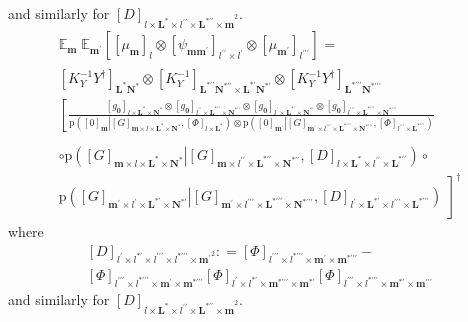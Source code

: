 \documentclass[preprint,12pt]{elsarticle}
\newcommand*{\M}[1]{\ensuremath{#1}\xspace}
\newcommand*{\x}{\times}
\newcommand*{\mi}[1]{\mathbf{#1}}
\newcommand*{\te}[2][]{\left\lbrack{#2}\right\rbrack_{#1}}
\newcommand*{\prob}[3]{\M{\mathrm{p}\!\left(\left.{#1}\right\vert{#2,#3}\right)}}
\newcommand*{\deq}{\M{\mathrel{\mathop:}=}}
\newcommand*{\evt}[3][]{\mathbb{E}_{#3}^{#1}\!#2}
\begin{document}
        and similarly for $\te[l\x\mi{L^{*}}\x l^{\prime\prime}\x\mi{L^{*\prime\prime}\x m}^{2}]{D}$.
        \begin{multline*}
            \evt{\;\evt{\te[]{\te[l]{\mu_{\mi{m}}} \otimes \te[l^{\prime\prime}\x l^{\prime}]{\psi_{\mi{mm^{\prime}}}} \otimes \te[l^{\prime\prime\prime}]{\mu_{\mi{m^{\prime}}}}}}{\mi{m^{\prime}}}}{\mi{m}} = \\
            \te[\mi{L^{*}N^{*}}]{K_{Y}^{-1} Y^{\dagger}} \otimes
            \te[\mi{L^{*\prime\prime}N^{*\prime\prime}}\x\mi{L^{*\prime}N^{*\prime}}]{K_{Y}^{-1}} \otimes
            \te[\mi{L^{*\prime\prime\prime}N^{*\prime\prime\prime}}]{K_{Y}^{-1} Y^{\dagger}} \\
            \left\lbrack\frac{
            \te[l\x\mi{L^{*}}\x\mi{N^{*}}]{g_{\mi{0}}} \otimes
            \te[l^{\prime\prime}\x\mi{L^{*\prime\prime}}\x\mi{N^{*\prime\prime}}]{g_{\mi{0}}} \otimes
            \te[l^{\prime}\x\mi{L^{*\prime}}\x\mi{N^{*\prime}}]{g_{\mi{0}}} \otimes
            \te[l^{\prime\prime\prime}\x\mi{L^{*\prime\prime\prime}}\x\mi{N^{*\prime\prime\prime}}]{g_{\mi{0}}}}
            {\prob{\te[\mi{m}]{0}}{\te[\mi{m}\x l\x \mi{L^{*}\x N^{*}}]{G}}{\te[l\x \mi{L^{*}}]{\Phi}} \otimes
            \prob{\te[\mi{m^{\prime}}]{0}}{\te[\mi{m^{\prime}}\x l^{\prime\prime\prime}\x \mi{L^{*\prime\prime\prime}\x N^{*\prime\prime\prime}}]{G}}{\te[l^{\prime\prime\prime}\x \mi{L^{*\prime\prime\prime}}]{\Phi}}} \right.\\
            \circ \prob{\te[\mi{m}\x l\x \mi{L^{*}\x N^{*}}]{G}}
            {\te[\mi{m}\x l^{\prime\prime}\x \mi{L^{*\prime\prime}\x N^{*\prime\prime}}]{G}}{\te[l\x\mi{L^{*}}\x l^{\prime\prime}\x\mi{L^{*\prime\prime}}]{D}} \circ \phantom{\frac{_{\vert}^{\vert}}{}}\\
            \left. \prob{\te[\mi{m^{\prime}}\x l^{\prime}\x \mi{L^{*\prime}\x N^{*\prime}}]{G}}
            {\te[\mi{m^{\prime}}\x l^{\prime\prime\prime}\x \mi{L^{*\prime\prime\prime}\x N^{*\prime\prime\prime}}]{G}}{\te[l^{\prime}\x\mi{L^{*\prime}}\x l^{\prime\prime\prime}\x\mi{L^{*\prime\prime\prime}}]{D}}
            \phantom{\frac{_{\vert}^{\vert}}{_{\vert}^{\vert}}}\right\rbrack^{\dagger}
        \end{multline*}
        where
        \begin{multline*}
            \te[l^{\prime}\x l^{*\prime}\x l^{\prime\prime\prime}\x l^{*\prime\prime\prime}\x\mi{m^{\prime}}^{2}]{D} \deq \te[l^{\prime\prime\prime}\x l^{*\prime\prime\prime}\x\mi{m^{\prime}}\x\mi{m^{*\prime\prime\prime}}]{\Phi} -  \\ 
            \te[l^{\prime\prime\prime}\x l^{*\prime\prime\prime}\x\mi{m^{\prime}}\x\mi{m^{*\prime\prime\prime}}]{\Phi}
            \te[l^{\prime}\x l^{*\prime}\x\mi{m^{*\prime\prime\prime}}\x\mi{m^{*\prime}}]{\Phi}
            \te[l^{\prime\prime\prime}\x l^{*\prime\prime\prime}\x\mi{m^{*\prime}}\x\mi{m^{\prime\prime\prime}}]{\Phi}
        \end{multline*}
        and similarly for $\te[l\x\mi{L^{*}}\x l^{\prime\prime}\x\mi{L^{*\prime\prime}\x m}^{2}]{D}$.


 

\end{document}
